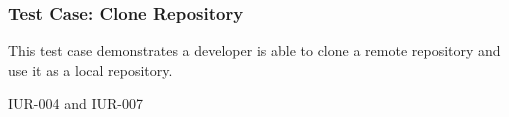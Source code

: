 \subsubsection{Test Case: Clone Repository}
\begin{description}[align=right,leftmargin=3.2cm,labelindent=3.0cm]
\item[Purpose:] This test case demonstrates a developer is able to clone a remote repository and use it as a local repository.
\item[Requirement:] IUR-004 and IUR-007
\end{description}
